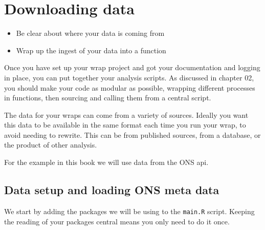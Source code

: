 \documentclass[
  letterpaper,
]{book}
\begin{document}

\hypertarget{sec-download}{%
\chapter{Downloading data}\label{sec-download}}

\begin{tcolorbox}[enhanced jigsaw, toprule=.15mm, left=2mm, colback=white, breakable, title=\textcolor{quarto-callout-note-color}{\faInfo}\hspace{0.5em}{Key Points}, colframe=quarto-callout-note-color-frame, opacitybacktitle=0.6, coltitle=black, titlerule=0mm, bottomrule=.15mm, rightrule=.15mm, bottomtitle=1mm, toptitle=1mm, arc=.35mm, leftrule=.75mm, opacityback=0, colbacktitle=quarto-callout-note-color!10!white]

\begin{itemize}
\item
  Be clear about where your data is coming from
\item
  Wrap up the ingest of your data into a function
\end{itemize}

\end{tcolorbox}

Once you have set up your wrap project and got your documentation and
logging in place, you can put together your analysis scripts. As
discussed in chapter 02, you should make your code as modular as
possible, wrapping different processes in functions, then sourcing and
calling them from a central script.

The data for your wraps can come from a variety of sources. Ideally you
want this data to be available in the same format each time you run your
wrap, to avoid needing to rewrite. This can be from published sources,
from a database, or the product of other analysis.

For the example in this book we will use data from the ONS api.

\hypertarget{data-setup-and-loading-ons-meta-data}{%
\section{Data setup and loading ONS meta
data}\label{data-setup-and-loading-ons-meta-data}}

We start by adding the packages we will be using to the \texttt{main.R}
script. Keeping the reading of your packages central means you only need
to do it once.
\end{document}
